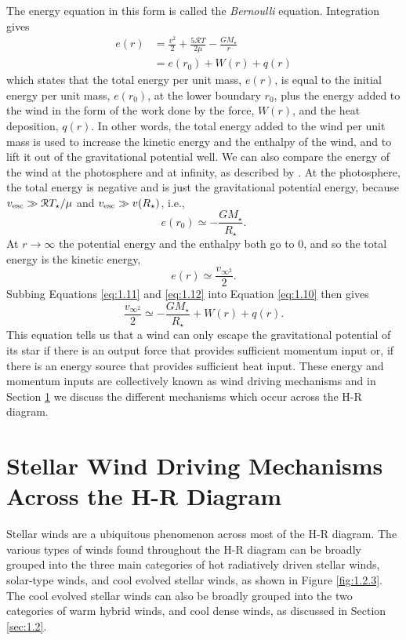 The energy equation in this form is called the \textit{Bernoulli} equation. Integration gives
\begin{align}\label{eq:1.10}
 e(r) &= \frac{v^2}{2} + \frac{5\mathcal{R}T}{2\mu}-\frac{GM_{\star}}{r} \nonumber \\
 & {} =e(r_{0}) + W(r) + q(r)
\end{align}
which states that the total energy per unit mass, $e(r)$, is equal to the initial energy per unit mass, $e(r_{0})$, at the lower boundary $r_{0}$, plus the energy added to the wind in the form of the work done by the force, $W(r)$, and the heat deposition, $q(r)$. In other words, the total energy added to the wind per unit mass is used to increase the kinetic energy and the enthalpy of the wind, and to lift it out of the gravitational potential well. We can also compare the energy of the wind at the photosphere and at infinity, as described by \cite{lamers_1998}. At the photosphere, the total energy is negative and is just the gravitational potential energy, because $v_{\rm{esc}} \gg \mathcal{R}T_{\star}/\mu$ and  $v_{\rm{esc}} \gg v(R_{\star})$, i.e.,
\begin{equation}\label{eq:1.11} 
e(r_{0}) \simeq -\frac{GM_{\star}}{R_{\star}}.
\end{equation}
At $r\rightarrow \infty$ the potential energy and the enthalpy both go to 0, and so the total energy is the kinetic energy,
\begin{equation}\label{eq:1.12} 
e(r) \simeq \frac{v_{\infty ^2}}{2}.
\end{equation}
Subbing Equations \ref{eq:1.11} and \ref{eq:1.12} into Equation \ref{eq:1.10} then gives
\begin{equation}
\frac{v_{\infty ^2}}{2} \simeq -\frac{GM_{\star}}{R_{\star}} + W(r) + q(r).
\end{equation}
This equation tells us that a wind can only escape the gravitational potential of its star if there is an output force that provides sufficient momentum input or, if there is an energy source that provides sufficient heat input. These energy and momentum inputs are collectively known as wind driving mechanisms and in Section \ref{sec:1.4} we discuss the different mechanisms which occur across the H-R diagram.

\section{Stellar Wind Driving Mechanisms Across the H-R Diagram}\label{sec:1.4}
Stellar winds are a ubiquitous phenomenon across most of the H-R diagram. The various types of winds found throughout the H-R diagram can be broadly grouped into the three main categories of hot radiatively driven stellar winds, solar-type winds, and cool evolved stellar winds, as shown in Figure \ref{fig:1.2.3}. The cool evolved stellar winds can also be broadly grouped into the two categories of warm hybrid winds, and cool dense winds, as discussed in Section \ref{sec:1.2}. 

